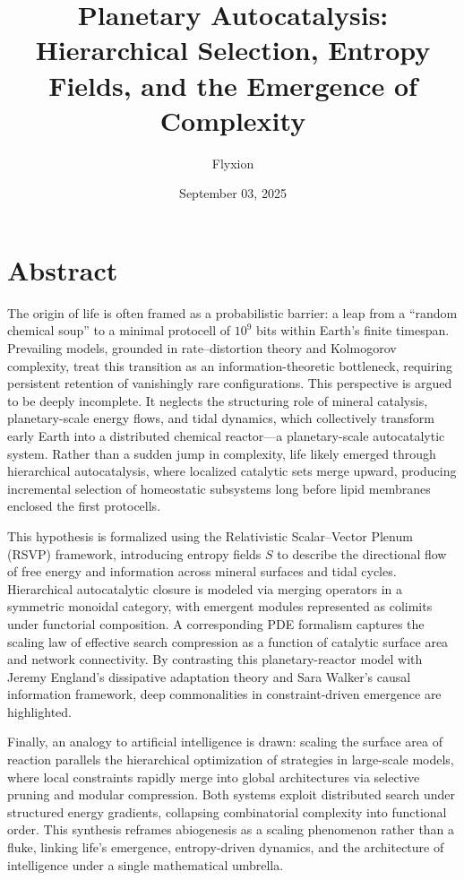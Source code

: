 \documentclass{book}
\title{Planetary Autocatalysis: Hierarchical Selection, Entropy Fields, and the Emergence of Complexity}
\author{Flyxion}
\date{September 03, 2025}
\begin{document}
\maketitle

\tableofcontents

\section*{Abstract}
The origin of life is often framed as a probabilistic barrier: a leap from a “random chemical soup” to a minimal protocell of $10^9$ bits within Earth’s finite timespan. Prevailing models, grounded in rate–distortion theory and Kolmogorov complexity, treat this transition as an information-theoretic bottleneck, requiring persistent retention of vanishingly rare configurations. This perspective is argued to be deeply incomplete. It neglects the structuring role of mineral catalysis, planetary-scale energy flows, and tidal dynamics, which collectively transform early Earth into a distributed chemical reactor—a planetary-scale autocatalytic system. Rather than a sudden jump in complexity, life likely emerged through hierarchical autocatalysis, where localized catalytic sets merge upward, producing incremental selection of homeostatic subsystems long before lipid membranes enclosed the first protocells.

This hypothesis is formalized using the Relativistic Scalar–Vector Plenum (RSVP) framework, introducing entropy fields $S$ to describe the directional flow of free energy and information across mineral surfaces and tidal cycles. Hierarchical autocatalytic closure is modeled via merging operators in a symmetric monoidal category, with emergent modules represented as colimits under functorial composition. A corresponding PDE formalism captures the scaling law of effective search compression as a function of catalytic surface area and network connectivity. By contrasting this planetary-reactor model with Jeremy England’s dissipative adaptation theory and Sara Walker’s causal information framework, deep commonalities in constraint-driven emergence are highlighted.

Finally, an analogy to artificial intelligence is drawn: scaling the surface area of reaction parallels the hierarchical optimization of strategies in large-scale models, where local constraints rapidly merge into global architectures via selective pruning and modular compression. Both systems exploit distributed search under structured energy gradients, collapsing combinatorial complexity into functional order. This synthesis reframes abiogenesis as a scaling phenomenon rather than a fluke, linking life’s emergence, entropy-driven dynamics, and the architecture of intelligence under a single mathematical umbrella.
\end{document}

